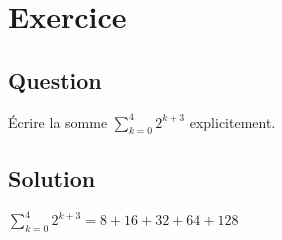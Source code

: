 \documentclass{article}
\begin{document}
\section{Exercice}

\subsection*{Question}
Écrire la somme $ \displaystyle{\sum_{k= 0 }^{ 4 }} 2^{k + 3} $ explicitement.

\subsection*{Solution}
$ \displaystyle{\sum_{k= 0 }^{ 4 }} 2^{k + 3} = 8 + 16 + 32 + 64 + 128 $
\end{document}
